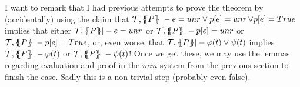 \documentclass[preprint]{sigplanconf}
\begin{document}
I want to remark that I had previous attempts to prove the theorem by
(accidentally) using the claim that ${\cal T},\{\!\!\{P\}\!\!\} |- e = unr \lor
p[e] = \mathop{unr} \lor p[e] = True$ implies that either ${\cal T},\{\!\!\{P\}\!\!\} |-
e = unr$ or $ {\cal T},\{\!\!\{P\}\!\!\} |- p[e] = \mathop{unr}$ or ${\cal T},\{\!\!\{P\}\!\!\} |-
p[e] = True$, or, even worse, that ${\cal T},\{\!\!\{P\}\!\!\} |- \varphi(t) \lor
\psi(t)$ implies ${\cal T},\{\!\!\{P\}\!\!\} |- \varphi(t)$ or ${\cal T},\{\!\!\{P\}\!\!\} |-
\psi(t)$! Once we get these, we may use the lemmas regarding
evaluation and proof in the $min$-system from the previous section to
finish the case. Sadly this is a non-trivial step (probably even
false).

\end{document}
